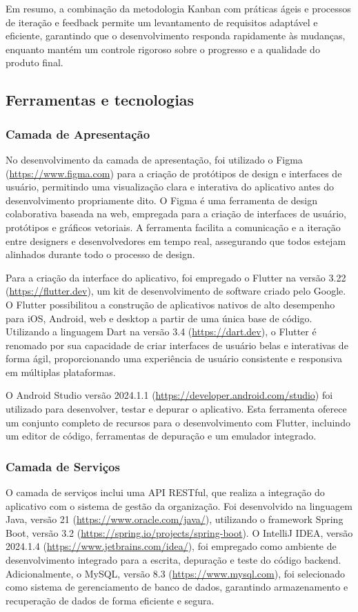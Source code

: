 Em resumo, a combinação da metodologia Kanban com práticas ágeis e processos de iteração e feedback permite um levantamento de requisitos adaptável e eficiente, garantindo que o desenvolvimento responda rapidamente às mudanças, enquanto mantém um controle rigoroso sobre o progresso e a qualidade do produto final.

\subsection{Ferramentas e tecnologias}

\subsubsection{Camada de Apresentação}

No desenvolvimento da camada de apresentação, foi utilizado o Figma (\url{https://www.figma.com}) para a criação de protótipos de design e interfaces de usuário, permitindo uma visualização clara e interativa do aplicativo antes do desenvolvimento propriamente dito. O Figma é uma ferramenta de design colaborativa baseada na web, empregada para a criação de interfaces de usuário, protótipos e gráficos vetoriais. A ferramenta facilita a comunicação e a iteração entre designers e desenvolvedores em tempo real, assegurando que todos estejam alinhados durante todo o processo de design.

Para a criação da interface do aplicativo, foi empregado o Flutter na versão 3.22 (\url{https://flutter.dev}), um kit de desenvolvimento de software criado pelo Google. O Flutter possibilitou a construção de aplicativos nativos de alto desempenho para iOS, Android, web e desktop a partir de uma única base de código. Utilizando a linguagem Dart na versão 3.4 (\url{https://dart.dev}), o Flutter é renomado por sua capacidade de criar interfaces de usuário belas e interativas de forma ágil, proporcionando uma experiência de usuário consistente e responsiva em múltiplas plataformas.

O Android Studio versão 2024.1.1 (\url{https://developer.android.com/studio}) foi utilizado para desenvolver, testar e depurar o aplicativo. Esta ferramenta oferece um conjunto completo de recursos para o desenvolvimento com Flutter, incluindo um editor de código, ferramentas de depuração e um emulador integrado.

\subsubsection{Camada de Serviços}

O camada de serviços inclui uma API RESTful, que realiza a integração do aplicativo com o sistema de gestão da organização. Foi desenvolvido na linguagem Java, versão 21 (\url{https://www.oracle.com/java/}), utilizando o framework Spring Boot, versão 3.2 (\url{https://spring.io/projects/spring-boot}).
O IntelliJ IDEA, versão 2024.1.4 (\url{https://www.jetbrains.com/idea/}), foi empregado como ambiente de desenvolvimento integrado para a escrita, depuração e teste do código backend. Adicionalmente, o MySQL, versão 8.3 (\url{https://www.mysql.com}), foi selecionado como sistema de gerenciamento de banco de dados, garantindo armazenamento e recuperação de dados de forma eficiente e segura.
